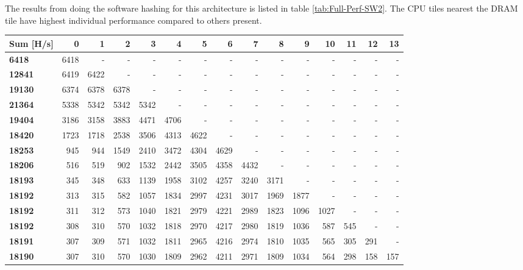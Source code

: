 \begin{appendix}
The results from doing the software hashing for this architecture is listed in table \ref{tab:Full-Perf-SW2}. 
The CPU tiles nearest the DRAM tile have highest individual performance compared to others present.

\begin{sidewaystable}
\centering
\begin{tabular}{| l || r r r r r r r r r r r r r r|}
  \hline 
  \textbf{Sum} [H/s] & \textbf{0} & \textbf{1} & \textbf{2} & \textbf{3} & \textbf{4} & \textbf{5} & \textbf{6} & \textbf{7} & \textbf{8} & \textbf{9} & \textbf{10} & \textbf{11} & \textbf{12} & \textbf{13}\\
  \hline                       
  \textbf{6418} & 6418 & - & - & - & - & - & - & - & - & - & - & - & - & -\\
  \textbf{12841} & 6419 & 6422 & - & - & - & - & - & - & - & - & - & - & - & -\\
  \textbf{19130} & 6374 & 6378 & 6378 & - & - & - & - & - & - & - & - & - & - & -\\
  \textbf{21364} & 5338 & 5342 & 5342 & 5342 & - & - & - & - & - & - & - & - & - & -\\
  \textbf{19404} & 3186 & 3158 & 3883 & 4471 & 4706 & - & - & - & - & - & - & - & - & -\\
  \textbf{18420} & 1723 & 1718 & 2538 & 3506 & 4313 & 4622 & - & - & - & - & - & - & - & -\\
  \textbf{18253} & 945 & 944 & 1549 & 2410 & 3472 & 4304 & 4629 & - & - & - & - & - & - & -\\
  \textbf{18206} & 516 & 519 & 902 & 1532 & 2442 & 3505 & 4358 & 4432 & - & - & - & - & - & -\\
  \textbf{18193} & 345 & 348 & 633 & 1139 & 1958 & 3102 & 4257 & 3240 & 3171 & - & - & - & - & -\\
  \textbf{18192} & 313 & 315 & 582 & 1057 & 1834 & 2997 & 4231 & 3017 & 1969 & 1877 & - & - & - & -\\
  \textbf{18192} & 311 & 312 & 573 & 1040 & 1821 & 2979 & 4221 & 2989 & 1823 & 1096 & 1027 & - & - & -\\
  \textbf{18192} & 308 & 310 & 570 & 1032 & 1818 & 2970 & 4217 & 2980 & 1819 & 1036 & 587 & 545 & - & -\\
  \textbf{18191} & 307 & 309 & 571 & 1032 & 1811 & 2965 & 4216 & 2974 & 1810 & 1035 & 565 & 305 & 291 & -\\
  \textbf{18190} & 307 &310 & 570 & 1030 & 1809 & 2962 & 4211 & 2971 & 1809 & 1034 & 564 & 298 & 158 & 157\\
  \hline  
\end{tabular}
\caption{Software performance results for the alternative architecture.}
\label{tab:Full-Perf-SW2}
\end{sidewaystable}


\end{appendix}
